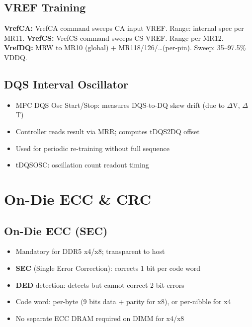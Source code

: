 \documentclass[10pt,a4paper,twoside]{article}
\begin{document}
\subsection{VREF Training}

\textbf{VrefCA:} VrefCA command sweeps CA input VREF. Range: internal spec per MR11.
\textbf{VrefCS:} VrefCS command sweeps CS VREF. Range per MR12.
\textbf{VrefDQ:} MRW to MR10 (global) + MR118/126/\ldots (per-pin). Sweep: 35--97.5\% VDDQ.

\subsection{DQS Interval Oscillator}

\begin{itemize}
  \item MPC DQS Osc Start/Stop: measures DQS-to-DQ skew drift (due to $\Delta$V, $\Delta$T)
  \item Controller reads result via MRR; computes tDQS2DQ offset
  \item Used for periodic re-training without full sequence
  \item tDQSOSC: oscillation count readout timing
\end{itemize}

\section{On-Die ECC \& CRC}

\subsection{On-Die ECC (SEC)}

\begin{itemize}
  \item Mandatory for DDR5 x4/x8; transparent to host
  \item \textbf{SEC} (Single Error Correction): corrects 1 bit per code word
  \item \textbf{DED} detection: detects but cannot correct 2-bit errors
  \item Code word: per-byte (9 bits data + parity for x8), or per-nibble for x4
  \item No separate ECC DRAM required on DIMM for x4/x8
\end{itemize}
\end{document}
